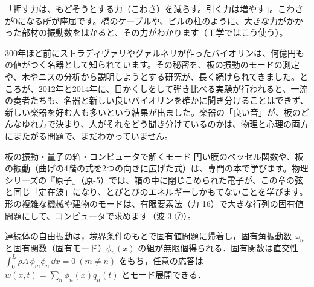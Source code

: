 \begin{phyomi}[$\omega^2=\omega_0^{\,2}(1-F/F_{\mathrm{cr}})$]
「押す力は、もどそうとする力（こわさ）を減らす。引く力は増やす」。こわさが0になる所が座屈です。橋のケーブルや、ビルの柱のように、大きな力がかかった部材の振動数をはかると、その力がわかります（工学ではこう使う）。
\end{phyomi}

\begin{phmada}
300年ほど前にストラディヴァリやグァルネリが作ったバイオリンは、何億円もの値がつく名器として知られています。その秘密を、板の振動のモードの測定や、木やニスの分析から説明しようとする研究が、長く続けられてきました。ところが、2012年と2014年に、目かくしをして弾き比べる実験が行われると、一流の奏者たちも、名器と新しい良いバイオリンを確かに聞き分けることはできず、新しい楽器を好む人も多いという結果が出ました。楽器の「良い音」が、板のどんなゆれ方で決まり、人がそれをどう聞き分けているのかは、物理と心理の両方にまたがる問題で、まだわかっていません。
\end{phmada}

\begin{phsaki}{板の振動・量子の箱・コンピュータで解くモード}
円い膜のベッセル関数や、板の振動（曲げの4階の式を2つの向きに広げた式）は、専門の本で学びます。物理シリーズの『原子』（原-5）では、箱の中に閉じこめられた電子が、この章の弦と同じ「定在波」になり、とびとびのエネルギーしかもてないことを学びます。形の複雑な機械や建物のモードは、有限要素法（力-16）で大きな行列の固有値問題にして、コンピュータで求めます（波-3 ⑦）。
\end{phsaki}

\begin{senmonsho}[振動工学の専門書の書き方]
\begin{bkhonbun}
連続体の自由振動は，境界条件のもとで固有値問題に帰着し，固有角振動数 $\omega_n$ と固有関数（固有モード）$\phi_n(x)$ の組が無限個得られる．固有関数は直交性 $\int_0^L\rho A\,\phi_m\phi_n\,\dd x=0\ (m\neq n)$ をもち，任意の応答は $w(x,t)=\sum_n\phi_n(x)q_n(t)$ とモード展開できる．
\end{bkhonbun}
\end{senmonsho}

